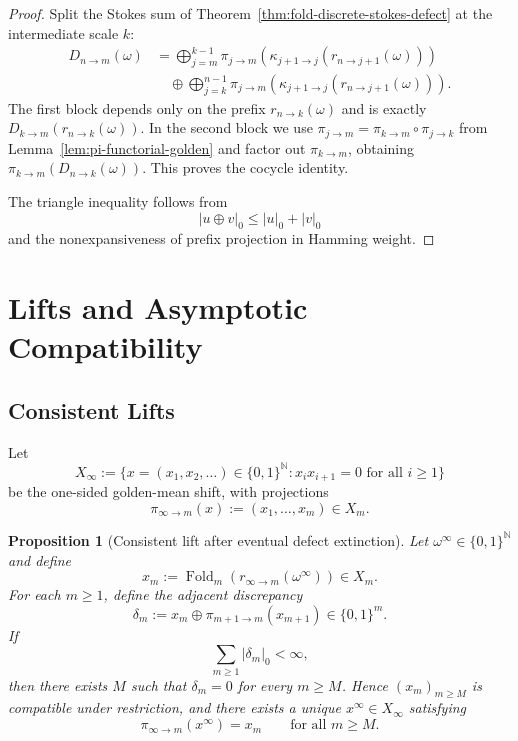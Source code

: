 \documentclass[11pt,letterpaper]{article}
\numberwithin{equation}{section}
\theoremstyle{plain}
\newtheorem{proposition}[theorem]{Proposition}
\theoremstyle{definition}
\theoremstyle{remark}
\newcommand{\NN}{\mathbb{N}}
\newcommand{\Xinf}{X_\infty}
\DeclareMathOperator{\Fold}{Fold}
\begin{document}
\begin{proof}
Split the Stokes sum of Theorem~\ref{thm:fold-discrete-stokes-defect} at the
intermediate scale $k$:
\[
\begin{aligned}
D_{n\to m}(\omega)
&=
\bigoplus_{j=m}^{k-1}
\pi_{j\to m}\!\left(
\kappa_{j+1\to j}(r_{n\to j+1}(\omega))
\right) \\
&\quad\oplus
\bigoplus_{j=k}^{n-1}
\pi_{j\to m}\!\left(
\kappa_{j+1\to j}(r_{n\to j+1}(\omega))
\right).
\end{aligned}
\]
The first block depends only on the prefix $r_{n\to k}(\omega)$ and is exactly
$D_{k\to m}(r_{n\to k}(\omega))$.  In the second block we use
$\pi_{j\to m}=\pi_{k\to m}\circ \pi_{j\to k}$ from
Lemma~\ref{lem:pi-functorial-golden} and factor out $\pi_{k\to m}$, obtaining
$\pi_{k\to m}(D_{n\to k}(\omega))$.  This proves the cocycle identity.

The triangle inequality follows from
\[
\lvert u\oplus v\rvert_0\le \lvert u\rvert_0+\lvert v\rvert_0
\]
and the nonexpansiveness of prefix projection in Hamming weight.
\end{proof}

\section{Lifts and Asymptotic Compatibility}

\subsection{Consistent Lifts}

Let
\[
\Xinf:=\{x=(x_1,x_2,\dots)\in\{0,1\}^{\NN}: x_ix_{i+1}=0\text{ for all }i\ge 1\}
\]
be the one-sided golden-mean shift, with projections
\[
\pi_{\infty\to m}(x):=(x_1,\dots,x_m)\in X_m.
\]

\begin{proposition}[Consistent lift after eventual defect extinction]
\label{prop:fold-naive-prefix-lift}
Let $\omega^\infty\in\{0,1\}^{\NN}$ and define
\[
x_m:=\Fold_m(r_{\infty\to m}(\omega^\infty))\in X_m.
\]
For each $m\ge 1$, define the adjacent discrepancy
\[
\delta_m:=x_m\oplus \pi_{m+1\to m}(x_{m+1})\in\{0,1\}^m.
\]
If
\[
\sum_{m\ge 1}\lvert \delta_m\rvert_0<\infty,
\]
then there exists $M$ such that $\delta_m=0$ for every $m\ge M$.  Hence
$(x_m)_{m\ge M}$ is compatible under restriction, and there exists a unique
$x^\infty\in\Xinf$ satisfying
\[
\pi_{\infty\to m}(x^\infty)=x_m
\qquad\text{for all }m\ge M.
\]
\end{proposition}
\end{document}
